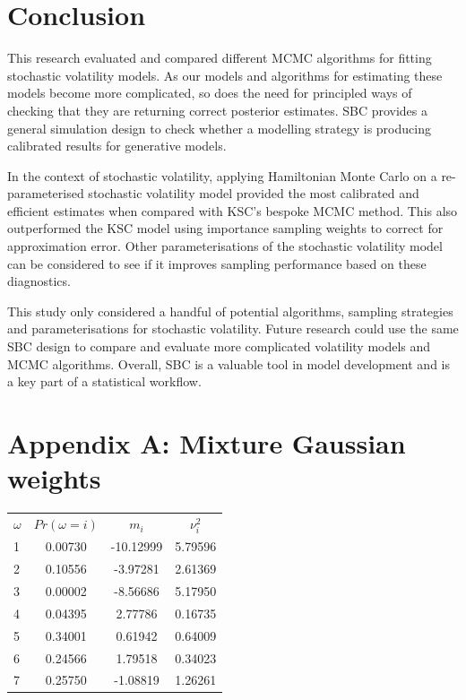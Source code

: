 \documentclass[12pt, a4paper]{article}
\begin{document}
\section{Conclusion}
This research evaluated and compared different MCMC algorithms for fitting stochastic volatility models. As our models and algorithms for estimating these models become more complicated, so does the need for principled ways of checking that they are returning correct posterior estimates. SBC provides a general simulation design to check whether a modelling strategy is producing calibrated results for generative models.

In the context of stochastic volatility, applying Hamiltonian Monte Carlo on a re-parameterised stochastic volatility model provided the most calibrated and efficient estimates when compared with KSC's bespoke MCMC method. This also outperformed the KSC model using importance sampling weights to correct for approximation error. Other parameterisations of the stochastic volatility model can be considered to see if it improves sampling performance based on these diagnostics. 

This study only considered a handful of potential algorithms, sampling strategies and parameterisations for stochastic volatility. Future research could use the same SBC design to compare and evaluate more complicated volatility models and MCMC algorithms. Overall, SBC is a valuable tool in model development and is a key part of a statistical workflow. 
 
\newpage



\newpage

\section{Appendix A: Mixture Gaussian weights}

\begin{table}[H]
    \centering
    \begin{tabular}{lccc} 
          $\omega$ &$Pr(\omega = i)$&  $m_i$&  $\nu^2_i$\\ 
          1&0.00730  &  -10.12999&  5.79596\\ 
          2&0.10556  &   -3.97281 &  2.61369\\ 
          3&0.00002 &  -8.56686 &   5.17950\\ 
          4&0.04395 &  2.77786  &   0.16735 \\ 
          5&0.34001&   0.61942    &  0.64009\\ 
          6&0.24566 &  1.79518    &  0.34023 \\ 
          7&0.25750 &  -1.08819    &  1.26261\\ 
    \end{tabular} 
\end{table}
\end{document}
